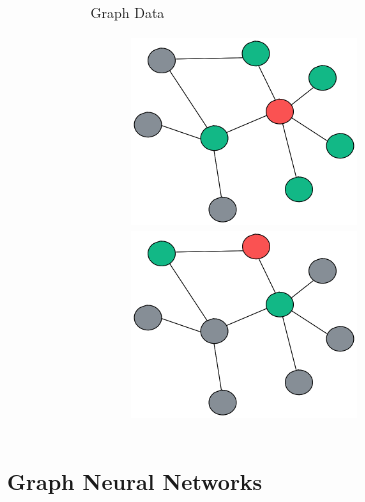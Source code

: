\documentclass[aspectratio=169]{beamer}
\begin{document}
\begin{frame}[t]
\begin{columns}
\begin{column}{.48\textwidth}
\begin{minipage}[c][.9\textheight][c]{.98\textwidth}
\begin{center}
\begin{figure}
\begin{overprint}
                        \end{overprint}
                    \end{figure}
                \end{center}
            \end{minipage}
        \end{column}%
        \begin{column}{.48\textwidth}
            \begin{minipage}[c][.9\textheight][c]{.98\textwidth}
                \begin{center}    
                    \vskip-0.225cm
                    Graph Data
                    \vskip0.5cm
                    \begin{figure}
                        \begin{overprint}
                        \centering \includegraphics[width=6cm, height=5cm]{img/graph_conv_1.png}
                        \centering \includegraphics[width=6cm, height=5cm]{img/graph_conv_2.png}
                        \end{overprint}
                    \end{figure}
                \end{center}
            \end{minipage}
        \end{column}%
    \end{columns}
\end{frame}


\subsection{Graph Neural Networks}
\end{document}
